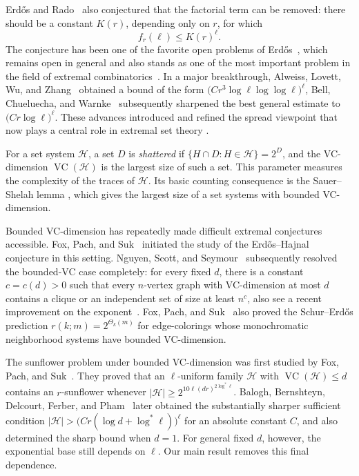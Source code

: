 \documentclass[10pt,a4paper]{amsart}
\newcommand*{\abs}[1]{\lvert#1\rvert}
\newcommand{\cH}{\mathcal{H}}
\newcommand{\VC}{\operatorname{VC}}
\begin{document}
Erd\H{o}s and Rado~\cite{ER60} also conjectured that the factorial term can be removed: there should be a constant \(K(r)\), depending only on \(r\), for which
\[
f_{r}(\ell)\le K(r)^{\ell}.
\]
The conjecture has been one of the favorite open problems of Erd\H{o}s~\cite{E81}, which remains open in general and also stands as one of the most important problem in the field of extremal combinatorics~\cite{ErdosProblem}. In a major breakthrough, Alweiss, Lovett, Wu, and Zhang~\cite{ALWZ21} obtained a bound of the form \(\bigl(Cr^{3}\log \ell\log\log \ell\bigr)^{\ell}\), Bell, Chueluecha, and Warnke~\cite{BCW21} subsequently sharpened the best general estimate to \(\bigl(Cr\log \ell\bigr)^{\ell}\). These advances introduced and refined the spread viewpoint that now plays a central role in extremal set theory
\cite{BDGGL26,FHIKLMP25,FK25,INST25,KLS25,KN24,KZD24,WX26}.

For a set system \(\cH\), a set \(D\) is \emph{shattered} if \(\{H\cap D:H\in\cH\}=2^{D}\), and the VC-dimension \(\VC(\cH)\) is the largest size of such a set. This parameter measures the complexity of the traces of \(\cH\). Its basic counting consequence is the Sauer--Shelah lemma \cite{Sauer72,Shelah72,VC71}, which gives the largest size of a set systems with bounded VC-dimension.

Bounded VC-dimension has repeatedly made difficult extremal conjectures accessible. Fox, Pach, and Suk~\cite{FPS19} initiated the study of the Erd\H{o}s--Hajnal conjecture in this setting. Nguyen, Scott, and Seymour~\cite{NSS25} subsequently resolved the bounded-VC case completely: for every fixed \(d\), there is a constant \(c=c(d)>0\) such that every \(n\)-vertex graph with VC-dimension at most \(d\) contains a clique or an independent set of size at least \(n^{c}\), also see a recent improvement on the exponent~\cite{SWZ26}. Fox, Pach, and Suk~\cite{FPS21} also proved the Schur--Erd\H{o}s prediction \(r(k;m)=2^{\Theta_{k}(m)}\) for edge-colorings whose monochromatic neighborhood systems have bounded VC-dimension.

The sunflower problem under bounded VC-dimension was first studied by Fox, Pach, and Suk~\cite{FPS23}. They proved that an \(\ell\)-uniform family \(\cH\) with \(\VC(\cH)\le d\) contains an \(r\)-sunflower whenever \(\abs{\cH}\ge 2^{10\ell(dr)^{2\log^{*}\ell}}\). Balogh, Bernshteyn, Delcourt, Ferber, and Pham~\cite{BBDFP25} later obtained the substantially sharper sufficient condition \(\abs{\cH}>\bigl(Cr(\log d+\log^{*}\ell)\bigr)^{\ell}\) for an absolute constant \(C\), and also determined the sharp bound when \(d=1\). For general fixed \(d\), however, the exponential base still depends on \(\ell\). Our main result removes this final dependence.
\end{document}
